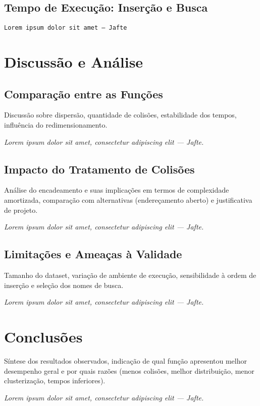 \documentclass[12pt,a4paper]{abntex2}
\newcommand{\placeholderAluno}[1]{\textit{Lorem ipsum dolor sit amet, consectetur adipiscing elit — #1.}}
\begin{document}
\subsection{Tempo de Execução: Inserção e Busca}
\begin{lstlisting}[style=console, caption={Tempos de inserção e busca (ms).}]
Lorem ipsum dolor sit amet — Jafte
\end{lstlisting}

\section{Discussão e Análise}
\subsection{Comparação entre as Funções}
Discussão sobre dispersão, quantidade de colisões, estabilidade dos tempos, influência do redimensionamento.

\placeholderAluno{Jafte}

\subsection{Impacto do Tratamento de Colisões}
Análise do encadeamento e suas implicações em termos de complexidade amortizada, comparação com alternativas (endereçamento aberto) e justificativa de projeto.

\placeholderAluno{Jafte}

\subsection{Limitações e Ameaças à Validade}
Tamanho do dataset, variação de ambiente de execução, sensibilidade à ordem de inserção e seleção dos nomes de busca.

\placeholderAluno{Jafte}

\section{Conclusões}
Síntese dos resultados observados, indicação de qual função apresentou melhor desempenho geral e por quais razões (menos colisões, melhor distribuição, menor clusterização, tempos inferiores).

\placeholderAluno{Jafte}
\end{document}
